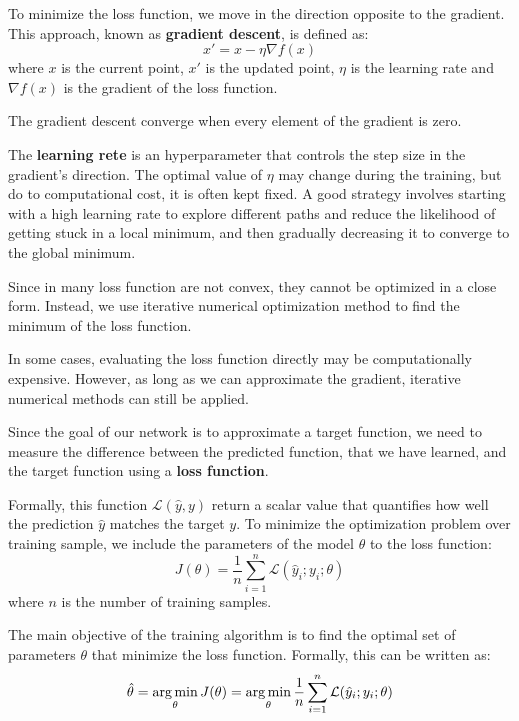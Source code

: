 To minimize the loss function, we move in the direction opposite to the gradient.
This approach, known as \textbf{gradient descent}, is defined as:
\begin{equation}
    x' = x - \eta \nabla f(x)
\end{equation}
where $x$ is the current point, $x'$ is the updated point, $\eta$ is the learning
rate and $\nabla f(x)$ is the gradient of the loss function.

\begin{note}
    The gradient descent converge when every element of the gradient is zero.
\end{note}

The \textbf{learning rete} is an hyperparameter that controls the step size in 
the gradient's direction. The optimal value of $\eta$ may change during the training, 
but do to computational cost, it is often kept fixed. A good strategy involves 
starting with a high learning rate to explore different paths and reduce the 
likelihood of getting stuck in a local minimum, and then gradually decreasing it 
to converge to the global minimum.

Since in many loss function are not convex, they cannot be optimized in a close
form. Instead, we use iterative numerical optimization method to find the minimum
of the loss function.

In some cases, evaluating the loss function directly may be computationally
expensive. However, as long as we can approximate the gradient, iterative
numerical methods can still be applied.

Since the goal of our network is to approximate a target function, we need to
measure the difference between the predicted function, that we have learned, and
the target function using a \textbf{loss function}.

Formally, this function $\mathcal{L}(\hat{y}, y)$ return a scalar value that
quantifies how well the prediction $\hat{y}$ matches the target $y$. To minimize
the optimization problem over training sample, we include the parameters of the
model $\theta$ to the loss function:
\begin{equation}
    J(\theta) = \frac{1}{n} \sum_{i=1}^n \mathcal{L}(\hat{y}_i; y_i; \theta)
\end{equation}
where $n$ is the number of training samples.

The main objective of the training algorithm is to find the optimal set of
parameters $\theta$ that minimize the loss function. Formally, this can be written
as:
\begin{equation}
    \hat{\theta} = \operatorname*{arg\,min}_{\theta} J(\theta) = \operatorname*{arg\,min}_{\theta} \frac{1}{n}
    \sum_{i=1}^n \mathcal{L}(\hat{y}_i; y_i; \theta)
\end{equation}

